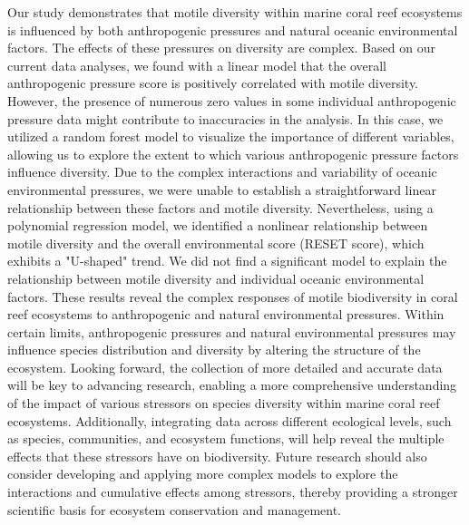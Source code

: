 \documentclass[a4paper, 11]{article}
\begin{document}
Our study demonstrates that motile diversity within marine coral reef ecosystems is influenced by both anthropogenic pressures and natural oceanic environmental factors. The effects of these pressures on diversity are complex. Based on our current data analyses, we found with a linear model that the overall anthropogenic pressure score is positively correlated with motile diversity. However, the presence of numerous zero values in some individual anthropogenic pressure data might contribute to inaccuracies in the analysis. In this case, we utilized a random forest model to visualize the importance of different variables, allowing us to explore the extent to which various anthropogenic pressure factors influence diversity. Due to the complex interactions and variability of oceanic environmental pressures, we were unable to establish a straightforward linear relationship between these factors and motile diversity. Nevertheless, using a polynomial regression model, we identified a nonlinear relationship between motile diversity and the overall environmental score (RESET score), which exhibits a "U-shaped" trend. We did not find a significant model to explain the relationship between motile diversity and individual oceanic environmental factors. These results reveal the complex responses of motile biodiversity in coral reef ecosystems to anthropogenic and natural environmental pressures. Within certain limits, anthropogenic pressures and natural environmental pressures may influence species distribution and diversity by altering the structure of the ecosystem. Looking forward, the collection of more detailed and accurate data will be key to advancing research, enabling a more comprehensive understanding of the impact of various stressors on species diversity within marine coral reef ecosystems. Additionally, integrating data across different ecological levels, such as species, communities, and ecosystem functions, will help reveal the multiple effects that these stressors have on biodiversity. Future research should also consider developing and applying more complex models to explore the interactions and cumulative effects among stressors, thereby providing a stronger scientific basis for ecosystem conservation and management.

\end{document}

